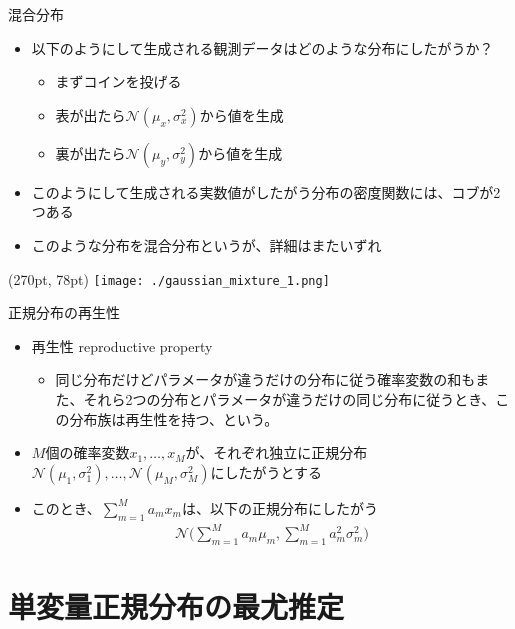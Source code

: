 \documentclass[aspectratio=169,unicode,dvipdfmx,14pt]{beamer}
\begin{document}
\begin{frame}{混合分布}
\begin{itemize}
\item 以下のようにして生成される観測データはどのような分布にしたがうか？
\begin{itemize}
\item まずコインを投げる
\item 表が出たら$\mathcal{N}(\mu_x,\sigma_x^2)$から値を生成
\item 裏が出たら$\mathcal{N}(\mu_y,\sigma_y^2)$から値を生成
\end{itemize}
\item このようにして生成される実数値がしたがう分布の密度関数には、コブが2つある
\item このような分布を混合分布というが、詳細はまたいずれ
\end{itemize}
\begin{textblock*}{0.4\linewidth}(270pt, 78pt)
    \centering
    \texttt{[image: ./gaussian\_mixture\_1.png]}
\end{textblock*}
\end{frame}



\begin{frame}{正規分布の再生性}
\begin{itemize}
\item 再生性 reproductive property
\begin{itemize}
\item 同じ分布だけどパラメータが違うだけの分布に従う確率変数の和もまた、それら2つの分布とパラメータが違うだけの同じ分布に従うとき、この分布族は再生性を持つ、という。
\end{itemize}
\item $M$個の確率変数$x_1,\ldots,x_M$が、それぞれ独立に正規分布$\mathcal{N}(\mu_1,\sigma_1^2), 
\ldots, \mathcal{N}(\mu_M,\sigma_M^2)$にしたがうとする
\item このとき、$\sum_{m=1}^M a_m x_m$は、以下の正規分布にしたがう
\begin{align}
\mathcal{N} \Big(\sum_{m=1}^M a_m \mu_m, \sum_{m=1}^M a_m^2 \sigma_m^2 \Big)
\end{align}
\end{itemize}
\end{frame}

\section{単変量正規分布の最尤推定}
\end{document}

